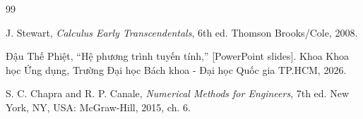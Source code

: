 \begin{thebibliography}{99}
\raggedright %
\setlength{\itemsep}{0pt} %


J. Stewart, \textit{Calculus Early Transcendentals}, 6th ed. Thomson Brooks/Cole, 2008.

Đậu Thế Phiệt, ``Hệ phương trình tuyến tính,'' [PowerPoint slides]. Khoa Khoa học Ứng dụng, Trường Đại học Bách khoa - Đại học Quốc gia TP.HCM, 2026.




S. C. Chapra and R. P. Canale, \textit{Numerical Methods for Engineers}, 7th ed. New York, NY, USA: McGraw-Hill, 2015, ch. 6.


\end{thebibliography}